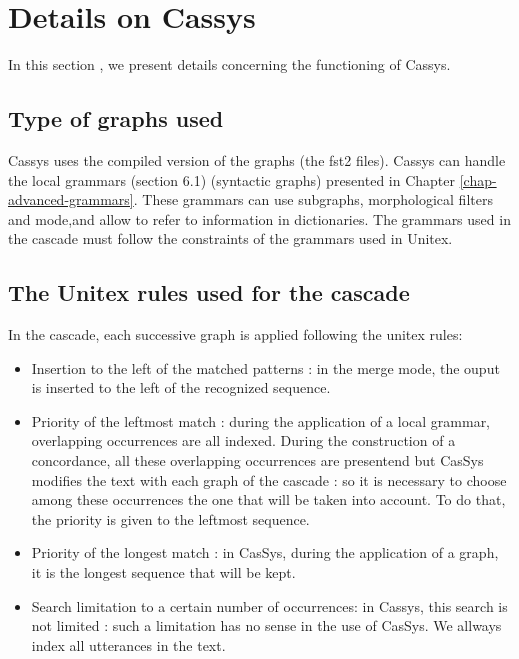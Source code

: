 \section{Details on Cassys}

In this section , we present details concerning the functioning of Cassys.

\subsection{Type of graphs used}

Cassys uses the compiled version of the graphs (the fst2 files).
Cassys can handle the local grammars (section 6.1) (syntactic graphs) presented in Chapter \ref{chap-advanced-grammars}. These grammars can use subgraphs, 
morphological filters and mode,and allow to refer to information in dictionaries. 
The grammars used in the cascade must follow the constraints of the grammars used in Unitex.

\subsection{The Unitex rules used for the cascade}

In the cascade, each successive graph is applied following the unitex rules:
\begin{itemize}
	\item Insertion to the left of the matched patterns : in the merge mode, the ouput is inserted to the left of the recognized sequence.
	\item	Priority of the leftmost match : during the application of a local grammar, overlapping occurrences are all indexed. 
	During the construction of a concordance, all these overlapping occurrences are presentend but CasSys modifies the text with each 
	graph of the cascade : so it is necessary to choose among these occurrences the one that will be taken into account. To do that, the priority is given to the leftmost sequence.
	\item Priority of the longest match : in CasSys, during the application of a graph, it is the longest sequence 
	that will be kept.
	\item	Search limitation to a certain number of occurrences: in Cassys, this search is not limited : such a limitation has no sense in the use of CasSys. We allways index all utterances in the text.
\end{itemize}

